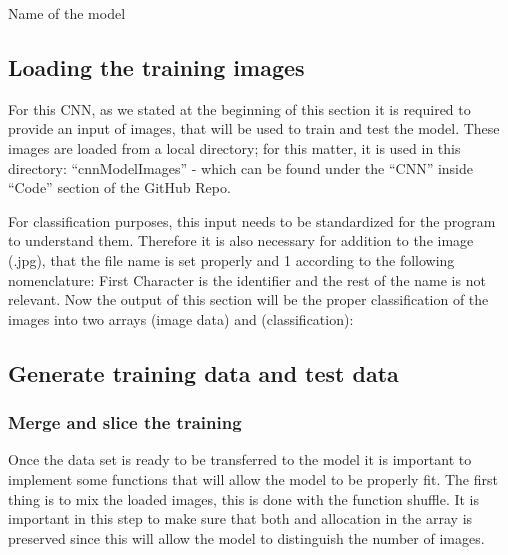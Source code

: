 \medskip

\begin{code}
        
    
    \caption{Name of the model} 
    
\end{code}    


\subsection{Loading the training images}

For this CNN, as we stated at the beginning of this section it is required to provide an input
of images, that will be used to train and test the model. These images are loaded from a local
directory; for this matter, it is used in this directory: ``cnnModelImages'' - which can be found under
the ``CNN'' inside ``Code'' section of the GitHub Repo.

For classification purposes, this input needs to be standardized for the program to understand them.
Therefore it is also necessary for addition to the image (.jpg), that the file name is set properly and
1
according to the following nomenclature: First Character is the identifier and the rest of the name
is not relevant.
Now the output of this section will be the proper classification of the images into two arrays 
(image data) and  (classification):

\begin{code}
        
    
    \caption{} 
    
\end{code}    

\subsection{Generate training data and test data}

\subsubsection{Merge and slice the training}

Once the data set is ready to be transferred to the model it is important to implement some  functions that will allow the model to be properly fit. The first thing is to mix the loaded images,  this is done with the function shuffle. It is important in this step to make sure that both  and  allocation in the array is preserved since this will allow the model to distinguish the number of images.

